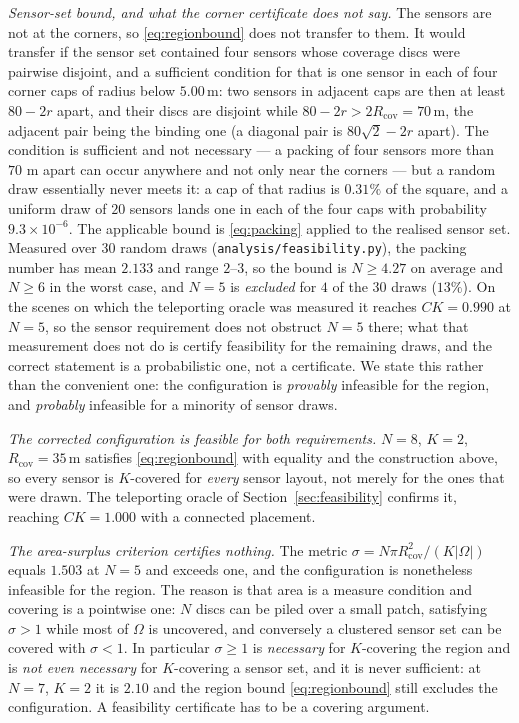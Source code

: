 \documentclass[conference]{IEEEtran}
\newcommand{\tokCapP}{9.3\times 10^{-6}}
\newcommand{\tokCapPct}{0.31}
\newcommand{\tokCapR}{5.00}
\newcommand{\tokCapTwoR}{70}
\newcommand{\tokInfOracle}{0.990}
\newcommand{\tokPackExcluded}{4}
\newcommand{\tokPackExclPct}{13}
\newcommand{\tokPackMax}{3}
\newcommand{\tokPackMean}{2.133}
\newcommand{\tokPackMin}{2}
\newcommand{\tokPackNMax}{6}
\newcommand{\tokPackNMean}{4.27}
\newcommand{\tokPackSeeds}{30}
\begin{document}
\emph{Sensor-set bound, and what the corner certificate does not say.} The
sensors are not at the corners, so \eqref{eq:regionbound} does not transfer
to them.  It would transfer if the sensor set contained four sensors whose
coverage discs were pairwise disjoint, and a sufficient condition for that
is one sensor in each of four corner caps of radius below
$\tokCapR\,\mathrm{m}$: two sensors in adjacent caps are then at least
$80-2r$ apart, and their discs are disjoint while
$80-2r>2R_{\mathrm{cov}}=\tokCapTwoR\,\mathrm{m}$, the adjacent pair
being the binding one (a diagonal pair is $80\sqrt2-2r$ apart).  The
condition is sufficient and not necessary --- a packing of four sensors
more than $\tokCapTwoR$ m apart can occur anywhere and not only near the
corners --- but a random draw essentially never meets it: a cap of that
radius is $\tokCapPct\%$ of the square, and a uniform draw of $20$ sensors
lands one in each of the four caps with probability $\tokCapP$.  The
applicable bound is \eqref{eq:packing} applied to the realised sensor set.
Measured over $\tokPackSeeds$ random draws
(\texttt{analysis/feasibility.py}), the packing number has mean
$\tokPackMean$ and range $\tokPackMin$--$\tokPackMax$, so the bound is
$N\ge \tokPackNMean$ on average and $N\ge \tokPackNMax$ in the worst
case, and $N=5$ is \emph{excluded} for $\tokPackExcluded$ of the
$\tokPackSeeds$ draws ($\tokPackExclPct\%$).  On the scenes on which the
teleporting oracle was measured it reaches $CK=\tokInfOracle$ at $N=5$, so
the sensor requirement does not obstruct $N=5$ there; what that
measurement does not do is certify feasibility for the remaining draws,
and the correct statement is a probabilistic one, not a certificate.  We state this rather than the
convenient one: the configuration is \emph{provably} infeasible for the
region, and
\emph{probably} infeasible for a minority of sensor draws.

\emph{The corrected configuration is feasible for both requirements.}
$N=8$, $K=2$, $R_{\mathrm{cov}}=35$\,m satisfies \eqref{eq:regionbound}
with equality and the construction above, so every sensor is $K$-covered
for \emph{every} sensor layout, not merely for the ones that were drawn.
The teleporting oracle of Section~\ref{sec:feasibility} confirms it,
reaching $CK=1.000$ with a connected placement.

\emph{The area-surplus criterion certifies nothing.} The metric
$\sigma=N\pi R_{\mathrm{cov}}^{2}/(K|\Omega|)$ equals $1.503$ at $N=5$ and
exceeds one, and the configuration is nonetheless infeasible for the region.
The reason is that area is a measure condition and covering is a pointwise
one: $N$ discs can be piled over a small patch, satisfying $\sigma>1$ while
most of $\Omega$ is uncovered, and conversely a clustered sensor set can be
covered with $\sigma<1$.  In particular $\sigma\ge1$ is \emph{necessary}
for $K$-covering the region and is \emph{not even necessary} for
$K$-covering a sensor set, and it is never sufficient: at $N=7$, $K=2$ it is
$2.10$ and the region bound \eqref{eq:regionbound} still excludes the
configuration.  A feasibility certificate has to be a covering argument.
\end{document}

